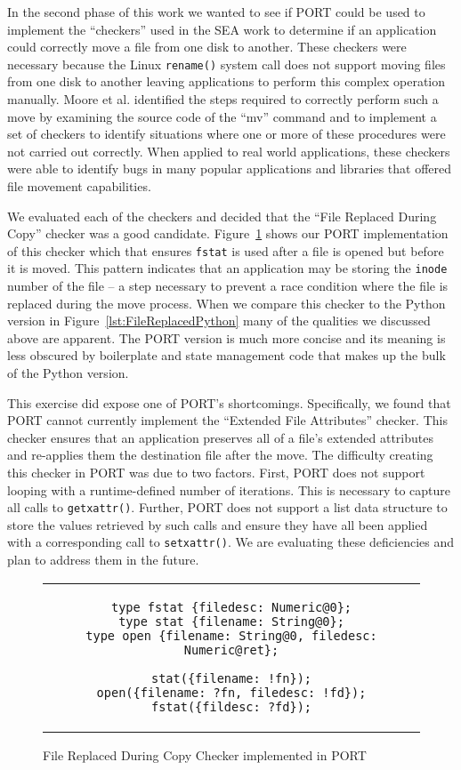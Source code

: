 In the second phase of this work we wanted to see if PORT could be used to
implement the ``checkers'' used in the SEA work to determine if an
application could correctly move  a file from one disk to another.
These checkers were necessary because the Linux
{\tt rename()} system call does not support moving files from one disk to
another leaving
applications to perform this complex
operation manually.
Moore et al.
identified the steps required to
correctly perform such a move by examining the source code of the ``mv''
command and
to implement a set of checkers to identify situations where one
or more of these procedures were not carried out correctly.
When applied to real world applications,
these checkers were able to identify bugs
in many popular applications and libraries that offered file movement
capabilities.

We evaluated each of the checkers and decided that the ``File Replaced
During Copy'' checker was a good candidate.
Figure~\ref{lst:FileReplacedPORT} shows our PORT implementation of this
checker which
that ensures {\tt fstat} is used after a file is opened but
before it is moved.  This pattern indicates that an application may be
storing the {\tt inode} number of the file -- a step necessary to prevent a race
condition where the file is replaced during the move process.  When
we compare this checker to the Python version in
Figure~\ref{lst:FileReplacedPython} many of the qualities we discussed
above are apparent.  The PORT version is much more concise and its meaning is
less obscured by boilerplate and state management code that makes up the
bulk of the Python version.

This exercise did expose one of PORT's shortcomings.  Specifically,
we found that PORT cannot currently implement the ``Extended File
Attributes'' checker.
This checker ensures that an application
preserves all of a file's extended attributes and re-applies them the
destination file after the move.
The difficulty creating this checker
in PORT was due to two factors.
First, PORT does not support looping with a
runtime-defined number of iterations.  This is necessary to capture all
calls to {\tt getxattr()}.
Further, PORT does not support a list data structure to store the values
retrieved by such calls and ensure they have all been applied with a
corresponding call to {\tt setxattr()}.
We are evaluating these deficiencies and plan to address them in the
future.

\begin{figure}[H]
\centering
\begin{tabular}{c}
\begin{lstlisting}
type fstat {filedesc: Numeric@0};
type stat {filename: String@0};
type open {filename: String@0, filedesc: Numeric@ret};

stat({filename: !fn});
open({filename: ?fn, filedesc: !fd});
fstat({fildesc: ?fd});
\end{lstlisting}
\end{tabular}
\caption{File Replaced During Copy Checker implemented in PORT}
\label{lst:FileReplacedPORT}
\end{figure}

